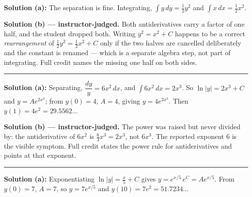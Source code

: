 \documentclass[12pt]{article}
\begin{document}



\textbf{Solution (a):} The separation is fine. Integrating, $\displaystyle\int y\,dy = \tfrac{1}{2}y^2$ and $\displaystyle\int x\,dx = \tfrac{1}{2}x^2$. 

\textbf{Solution (b) --- instructor-judged.} Both antiderivatives carry a factor of one half, and the student dropped both. Writing $y^2 = x^2 + C$ happens to be a correct \emph{rearrangement} of $\tfrac12 y^2 = \tfrac12 x^2 + C$ only if the two halves are cancelled deliberately and the constant is renamed --- which is a separate algebra step, not part of integrating. Full credit names the missing one half on both sides.

\vspace{0.2cm}\noindent\rule{\linewidth}{0.2pt}\vspace{0.2cm}


\textbf{Solution (a):} Separating, $\dfrac{dy}{y} = 6x^2\,dx$, and $\displaystyle\int 6x^2\,dx = 2x^3$. So $\ln|y| = 2x^3 + C$ and $y = Ae^{2x^3}$; from $y(0) = 4$, $A = 4$, giving $y = 4e^{2x^3}$. Then $y(1) = 4e^{2} = 29.5562\ldots$ 

\textbf{Solution (b) --- instructor-judged.} The power was raised but never divided by: the antiderivative of $6x^2$ is $\frac{6}{3}x^3 = 2x^3$, not $6x^3$. The reported exponent $6$ is the visible symptom. Full credit states the power rule for antiderivatives and points at that exponent.

\vspace{0.2cm}\noindent\rule{\linewidth}{0.2pt}\vspace{0.2cm}


\textbf{Solution (a):} Exponentiating $\ln|y| = \frac{x}{5} + C$ gives $y = e^{x/5}\,e^{C} = Ae^{x/5}$. From $y(0) = 7$, $A = 7$, so $y = 7e^{x/5}$ and $y(10) = 7e^{2} = 51.7234\ldots$ 
\end{document}
